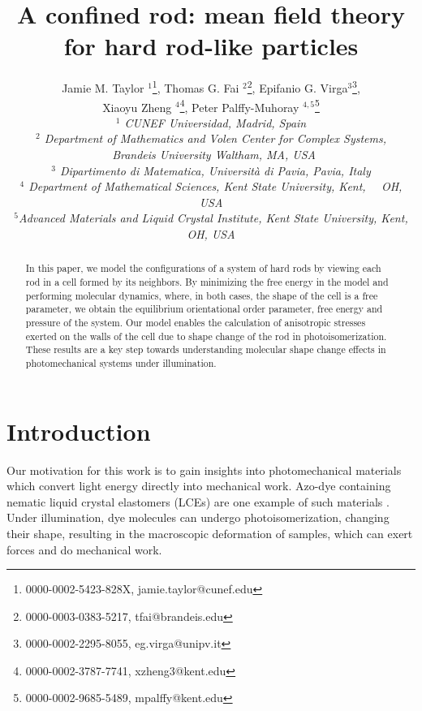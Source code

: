 \documentclass{article}
\begin{document}
\title{A confined rod: mean field theory for hard rod-like particles}
\author{ Jamie M. Taylor $^1$\thanks{%
0000-0002-5423-828X, jamie.taylor@cunef.edu}, Thomas G. Fai $^2$\thanks{%
0000-0003-0383-5217, tfai@brandeis.edu}, Epifanio G. Virga$^3$\thanks{%
0000-0002-2295-8055, eg.virga@unipv.it}, \\
Xiaoyu Zheng $^{4}$\thanks{%
0000-0002-3787-7741, xzheng3@kent.edu}, Peter Palffy-Muhoray $^{4,5}$\thanks{%
0000-0002-9685-5489, mpalffy@kent.edu}\\
\emph{$^{1}$ CUNEF Universidad, Madrid, Spain}\\
\emph{$^{2}$ Department of Mathematics and Volen Center for Complex Systems,}%
\\
\emph{\ Brandeis University Waltham, MA, USA} \\
\emph{$^3$ Dipartimento di Matematica, Universit\`{a} di Pavia, Pavia, Italy 
}\\
\emph{$^{4}$ Department of Mathematical Sciences, Kent State University,
Kent, \ \ OH, USA }\\
\emph{$^{5}$Advanced Materials and Liquid Crystal Institute, Kent State
University, Kent, OH, USA} }
\maketitle

\begin{abstract}
In this paper, we model the configurations of a system of hard rods by
viewing each rod in a cell formed by its neighbors. By minimizing the free
energy in the model and performing molecular dynamics, where, in both cases,
the shape of the cell is a free parameter, we obtain the equilibrium
orientational order parameter, free energy and pressure of the system. Our
model enables the calculation of anisotropic stresses exerted on the walls
of the cell due to shape change of the rod in photoisomerization. These
results are a key step towards understanding molecular shape change effects
in photomechanical systems under illumination.
\end{abstract}

\section{Introduction}

Our motivation for this work is to gain insights into photomechanical
materials which convert light energy directly into mechanical work. Azo-dye
containing nematic liquid crystal elastomers (LCEs) are one example of such
materials \cite{swimming, white, Kuzyk, guo}. Under illumination, dye
molecules can undergo photoisomerization, changing their shape, resulting in
the macroscopic deformation of samples, which can exert forces and do
mechanical work.
\end{document}
